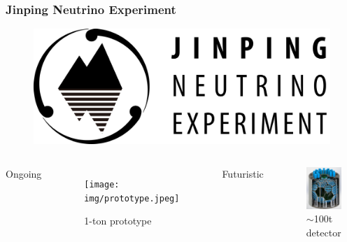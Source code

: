 \documentclass[handout]{beamer}
\begin{document}
\begin{frame}
\frametitle{Jinping Neutrino Experiment}
\setlength{\abovecaptionskip}{-2mm}
\begin{figure}
    \centering
    \includegraphics[width=0.3\linewidth]{img/J.png}
\end{figure}
\vspace{-4mm}
\begin{columns}
\begin{center}
    Ongoing
\end{center}
\begin{figure}
    \centering
    \caption{1-ton prototype}
    \texttt{[image: img/prototype.jpeg]}
\end{figure}
\begin{center}
    Futuristic
\end{center}
\begin{figure}
    \centering
    \caption{$\sim$100t detector}
    \includegraphics[width=0.6\linewidth]{img/100tondetector.png}
\end{figure}
\end{columns}
\end{frame}
\end{document}
